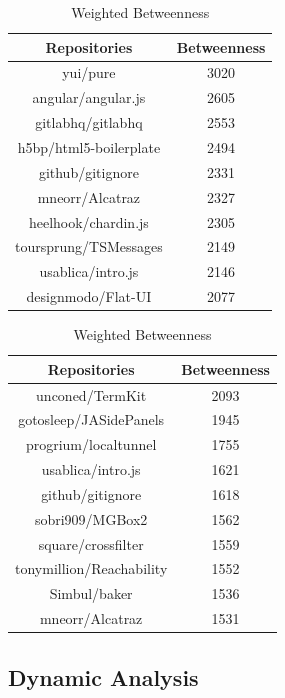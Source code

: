 \documentclass[11pt]{article}
\begin{document}
\begin{table}[ht]
  \begin{minipage}[b]{0.45\linewidth}
    \centering
    \begin{tabular}{cc}
      Repositories        & Betweenness \\
      \hline
      yui/pure            & 3020 \\
      angular/angular.js  & 2605 \\
      gitlabhq/gitlabhq   & 2553 \\
      h5bp/html5-boilerplate & 2494 \\
      github/gitignore    & 2331 \\
      mneorr/Alcatraz     & 2327 \\
      heelhook/chardin.js & 2305 \\
      toursprung/TSMessages & 2149 \\
      usablica/intro.js   & 2146 \\
      designmodo/Flat-UI  & 2077 \\
      \hline
    \end{tabular}
    \caption{Unweighted Betweenness}
    \label{tab:unweight_between}
  \end{minipage} %
  \hfill %
  \begin{minipage}[b]{0.45\linewidth}
    \centering
    \begin{tabular}{cc}
      Repositories        & Betweenness \\
      \hline
      unconed/TermKit     & 2093 \\
      gotosleep/JASidePanels & 1945 \\
      progrium/localtunnel & 1755 \\
      usablica/intro.js   & 1621 \\
      github/gitignore    & 1618 \\
      sobri909/MGBox2     & 1562 \\
      square/crossfilter  & 1559 \\
      tonymillion/Reachability & 1552 \\
      Simbul/baker        & 1536 \\
      mneorr/Alcatraz     & 1531 \\
      \hline
    \end{tabular}
    \caption{Weighted Betweenness}
    \label{tab:weight_between}
  \end{minipage} %
\end{table}

\subsection{Dynamic Analysis}
\end{document}
